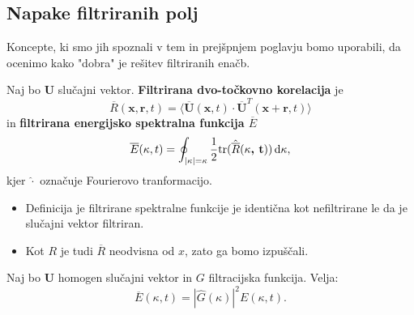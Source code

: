 \documentclass[mat2, tisk]{fmfdelo}
\newcommand{\bd}{\textbf}
\begin{document}
\subsection{Napake filtriranih polj}

Koncepte, ki smo jih spoznali v tem in prejšpnjem poglavju bomo 
uporabili, da ocenimo kako "dobra" je rešitev filtriranih enačb.

\begin{definicija}
Naj bo $\bd{U}$ slučajni vektor. \bd{Filtrirana dvo-točkovno korelacija}
je 
\begin{equation}
\overline{R}(\bd{x},\bd{r},t) = \langle \overline{\bd{U}}(\bd{x}, t) \cdot \overline{\bd{U}}^T(\bd{x} + \bd{r}, t) \rangle
\end{equation} 
in \bd{filtrirana energijsko spektralna funkcija $\overline{E}$} 
\begin{equation}
\overline{E}(\kappa, t) = \oint_{|\bd{\text{$\kappa$}}| = \kappa} \frac{1}{2} \text{tr}(\hat{\overline{R}}(\bd{\text{$\kappa$}, t})) \dif \bd{\text{$\kappa$}},
\end{equation}
kjer $\hat{\cdot}$ označuje Fourierovo tranformacijo.
\end{definicija}

\begin{opomba}
\hfill
\begin{itemize}
  \item Definicija je filtrirane spektralne funkcije je identična kot nefiltrirane 
  le da je slučajni vektor filtriran.
  \item Kot $R$ je tudi $\overline{R}$ neodvisna od $x$, zato ga bomo izpuščali.
\end{itemize}
\end{opomba}

\begin{lema}
Naj bo $\bd{U}$ homogen slučajni vektor in $G$ filtracijska funkcija. Velja: 
\begin{equation}
\overline{E}(\kappa, t) = |\hat{G}(\kappa)|^2 E(\kappa, t).
\end{equation}
\end{lema}
\end{document}
